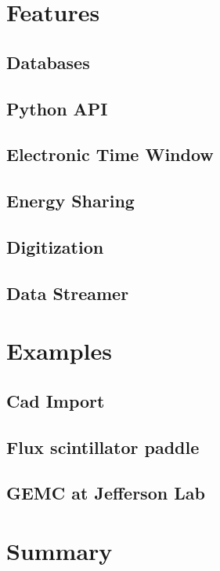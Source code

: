\section{Features}
\label{sec:features}

\subsection{Databases}
\label{subsec:databases}

\subsection{Python API}
\label{subsec:api}

\subsection{Electronic Time Window}
\label{subsec:time_window}

\subsection{Energy Sharing}
\label{subsec:energy_sharing}

\subsection{Digitization}
\label{subsec:digitization}

\subsection{Data Streamer}
\label{subsec:data_streamer}


\section{Examples}
\label{sec:examples}

\subsection{Cad Import}
\label{subsec:cad_import}

\subsection{Flux scintillator paddle}
\label{subsec:flux_scintillator_paddle}

\subsection{GEMC at Jefferson Lab}
\label{subsec:clas12}


\section{Summary}
\label{sec:summary}

